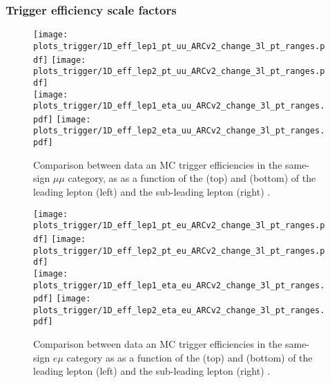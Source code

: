 \subsubsection*{Trigger efficiency scale factors}

\begin{figure}[htp]
\centering
\texttt{[image: plots\_trigger/1D\_eff\_lep1\_pt\_uu\_ARCv2\_change\_3l\_pt\_ranges.pdf]}
\texttt{[image: plots\_trigger/1D\_eff\_lep2\_pt\_uu\_ARCv2\_change\_3l\_pt\_ranges.pdf]} \\
\texttt{[image: plots\_trigger/1D\_eff\_lep1\_eta\_uu\_ARCv2\_change\_3l\_pt\_ranges.pdf]}
\texttt{[image: plots\_trigger/1D\_eff\_lep2\_eta\_uu\_ARCv2\_change\_3l\_pt\_ranges.pdf]}
\caption[Trigger efficiency for the same-sign $\mu\mu$ category]{Comparison between data an MC trigger efficiencies in the same-sign $\mu\mu$ category, as as a function of the \pt (top) and  \etac (bottom) of the leading lepton (left) and the sub-leading lepton (right) \cite{CMS_AN_2017-029}.}
\label{fig:trigeffsmumu}
\end{figure}

\begin{figure}[htp]
\centering
\texttt{[image: plots\_trigger/1D\_eff\_lep1\_pt\_eu\_ARCv2\_change\_3l\_pt\_ranges.pdf]}
\texttt{[image: plots\_trigger/1D\_eff\_lep2\_pt\_eu\_ARCv2\_change\_3l\_pt\_ranges.pdf]} \\
\texttt{[image: plots\_trigger/1D\_eff\_lep1\_eta\_eu\_ARCv2\_change\_3l\_pt\_ranges.pdf]}
\texttt{[image: plots\_trigger/1D\_eff\_lep2\_eta\_eu\_ARCv2\_change\_3l\_pt\_ranges.pdf]}
\caption[Trigger efficiency for the $e\mu$ category]{Comparison between data an MC trigger efficiencies in the same-sign $e\mu$ category as as a function of the \pt (top) and \etac (bottom) of the leading lepton (left) and the sub-leading lepton (right) \cite{CMS_AN_2017-029}.}
\label{fig:trigeffsemu}
\end{figure}


